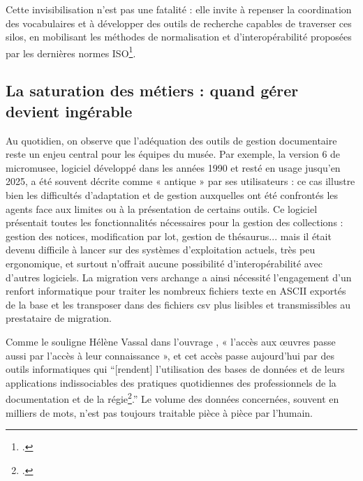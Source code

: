 Cette invisibilisation n’est pas une fatalité : elle invite à repenser la coordination des vocabulaires et à développer des outils de recherche capables de traverser ces silos, en mobilisant les méthodes de normalisation et d’interopérabilité proposées par les dernières normes ISO\footcite{chichereauNormesConceptionGestion2007}.

\subsection{La saturation des métiers : quand gérer devient ingérable}

Au quotidien, on observe que l’adéquation des outils de gestion documentaire reste un enjeu central pour les équipes du musée. Par exemple, la version 6 de \gls{micromusee}, logiciel développé dans les années 1990 et resté en usage jusqu’en 2025, a été souvent décrite comme « antique » par ses utilisateurs : ce cas illustre bien les difficultés d’adaptation et de gestion auxquelles ont été confrontés les agents face aux limites ou à la présentation de certains outils. Ce logiciel présentait toutes les fonctionnalités nécessaires pour la gestion des collections : gestion des notices, modification par lot, gestion de thésaurus... mais il était devenu difficile à lancer sur des systèmes d’exploitation actuels, très peu ergonomique, et surtout n’offrait aucune possibilité d’interopérabilité avec d’autres logiciels. La migration vers \gls{archange} a ainsi nécessité l’engagement d’un renfort informatique pour traiter les nombreux fichiers texte en ASCII exportés de la base et les transposer dans des fichiers csv plus lisibles et transmissibles au prestataire de migration.

Comme le souligne Hélène Vassal dans l'ouvrage , « l’accès aux œuvres passe aussi par l’accès à leur connaissance », et cet accès passe aujourd’hui par des outils informatiques qui \enquote{[rendent] l’utilisation des bases de données et de leurs applications indissociables des pratiques quotidiennes des professionnels de la documentation et de la régie\footcite{merleau-pontyDocumenterCollectionsMusees2016}.} Le volume des données concernées, souvent en milliers de mots, n’est pas toujours traitable pièce à pièce par l’humain.

